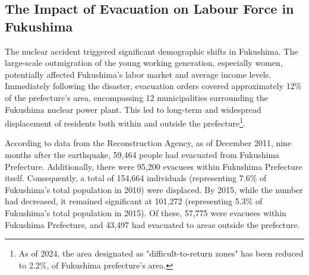 \documentclass[a4paper,12pt]{article}
\begin{document}








\subsection{The Impact of Evacuation on Labour Force in Fukushima}

The nuclear accident triggered significant demographic shifts in Fukushima. The large-scale outmigration of the young working generation, especially women, potentially affected Fukushima's labor market and average income levels. Immediately following the disaster, evacuation orders covered approximately 12\% of the prefecture's area, encompassing 12 municipalities surrounding the Fukushima nuclear power plant. This led to long-term and widespread displacement of residents both within and outside the prefecture\footnote{As of 2024, the area designated as "difficult-to-return zones" has been reduced to 2.2\%, of Fukushima prefecture’s area.}.


According to data from the Reconstruction Agency, as of December 2011, nine months after the earthquake, 59,464 people had evacuated from Fukushima Prefecture. Additionally, there were 95,200 evacuees within Fukushima Prefecture itself. Consequently, a total of 154,664 individuals (representing 7.6\% of Fukushima's total population in 2010) were displaced. By 2015, while the number had decreased, it remained significant at 101,272 (representing 5.3\% of Fukushima's total population in 2015). Of these, 57,775 were evacuees within Fukushima Prefecture, and 43,497 had evacuated to areas outside the prefecture.
\end{document}
